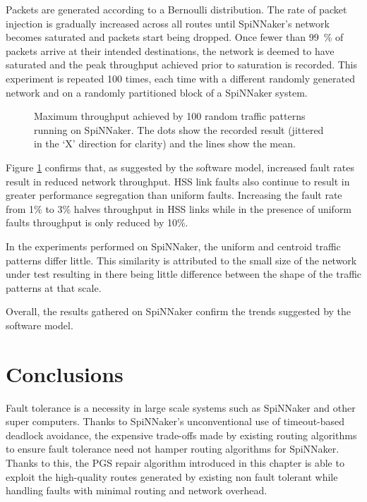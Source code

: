 				Packets are generated according to a Bernoulli distribution. The rate
				of packet injection is gradually increased across all routes until
				SpiNNaker's network becomes saturated and packets start being dropped.
				Once fewer than \SI{99}{\percent} of packets arrive at their intended
				destinations, the network is deemed to have saturated and the peak
				throughput achieved prior to saturation is recorded. This experiment is
				repeated 100 times, each time with a different randomly generated
				network and on a randomly partitioned block of a SpiNNaker system.
				
				\begin{figure}
					\center
					
					\caption{Maximum throughput achieved by \num{100} random traffic
					patterns running on SpiNNaker. The dots show the recorded result
					(jittered in the `X' direction for clarity) and the lines show the
					mean.}
					\label{fig:routing-hardware}
				\end{figure}
				
				Figure \ref{fig:routing-hardware} confirms that, as suggested by the
				software model, increased fault rates result in reduced network
				throughput. HSS link faults also continue to result in greater
				performance segregation than uniform faults. Increasing the fault rate
				from 1\% to 3\% halves throughput in HSS links while in the presence of
				uniform faults throughput is only reduced by 10\%.
				
				In the experiments performed on SpiNNaker, the uniform and centroid
				traffic patterns differ little. This similarity is attributed to the
				small size of the network under test resulting in there being little
				difference between the shape of the traffic patterns at that scale.
				
				Overall, the results gathered on SpiNNaker confirm the trends suggested
				by the software model.
		
	\section{Conclusions}
		
		Fault tolerance is a necessity in large scale systems such as SpiNNaker and
		other super computers. Thanks to SpiNNaker's unconventional use of
		timeout-based deadlock avoidance, the expensive trade-offs made by existing
		routing algorithms to ensure fault tolerance need not hamper routing
		algorithms for SpiNNaker. Thanks to this, the PGS repair algorithm
		introduced in this chapter is able to exploit the high-quality routes
		generated by existing non fault tolerant while handling faults with minimal
		routing and network overhead.
		
